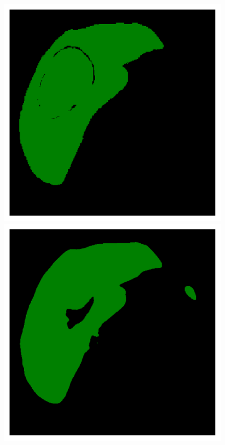 {\begin{figure}[!ht]
\begin{mdframed}[backgroundcolor=blue!50,linecolor=blue!50]
\begin{minipage}{4cm}
	\end{minipage} \hspace{-0.3cm}
	\begin{minipage}{4cm}
		\includegraphics[width=\linewidth]{images/LiverVE_GT_Pat6_6}
	\end{minipage} \hspace{-0.3cm}
	\begin{minipage}{4cm}
		\includegraphics[width=\linewidth]{images/LiverVE_Pred_Pat6_6}

\end{minipage}
\end{mdframed}
\end{figure}}
